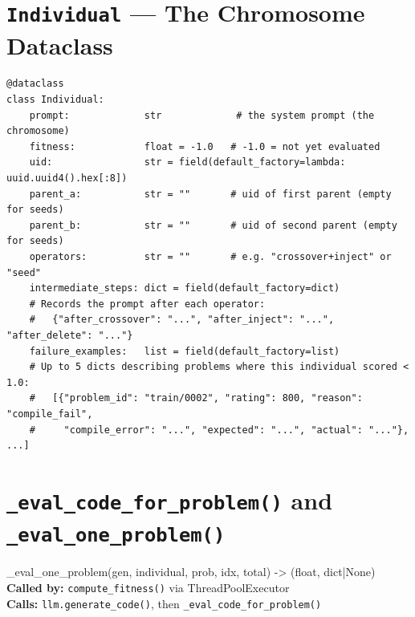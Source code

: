 \documentclass[11pt,a4paper]{report}
\newcommand{\fn}[1]{\texttt{#1}}
\begin{document}
\section{\fn{Individual} --- The Chromosome Dataclass}

\begin{lstlisting}[style=example]
@dataclass
class Individual:
    prompt:             str             # the system prompt (the chromosome)
    fitness:            float = -1.0   # -1.0 = not yet evaluated
    uid:                str = field(default_factory=lambda: uuid.uuid4().hex[:8])
    parent_a:           str = ""       # uid of first parent (empty for seeds)
    parent_b:           str = ""       # uid of second parent (empty for seeds)
    operators:          str = ""       # e.g. "crossover+inject" or "seed"
    intermediate_steps: dict = field(default_factory=dict)
    # Records the prompt after each operator:
    #   {"after_crossover": "...", "after_inject": "...", "after_delete": "..."}
    failure_examples:   list = field(default_factory=list)
    # Up to 5 dicts describing problems where this individual scored < 1.0:
    #   [{"problem_id": "train/0002", "rating": 800, "reason": "compile_fail",
    #     "compile_error": "...", "expected": "...", "actual": "..."}, ...]
\end{lstlisting}

\section{\fn{\_eval\_code\_for\_problem()} and \fn{\_eval\_one\_problem()}}

\begin{specbox}{\_eval\_one\_problem(gen, individual, prob, idx, total) -> (float, dict|None)}
\textbf{Called by:} \fn{compute\_fitness()} via ThreadPoolExecutor\\
\textbf{Calls:} \fn{llm.generate\_code()}, then \fn{\_eval\_code\_for\_problem()}
\end{specbox}
\end{document}
